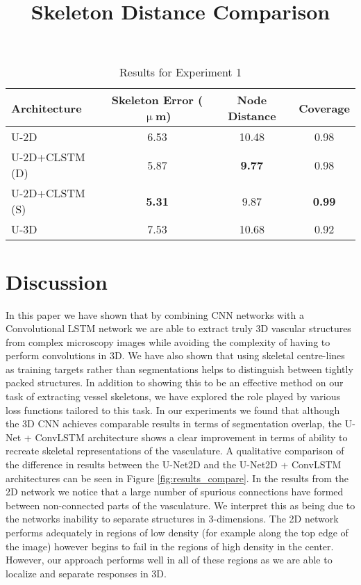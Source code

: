 \documentclass[journal,transmag]{IEEEtran}
\begin{document}
\begin{table}[h]
\title{Skeleton Distance Comparison}
\centering
\begin{tabular}{l|c|c|c}
Architecture & Skeleton Error ($\upmu$m) & Node Distance & Coverage\\
\hline
U-2D & 6.53 & 10.48 & 0.98 \\
U-2D+CLSTM (D) & 5.87 & \textbf{9.77} & 0.98 \\
U-2D+CLSTM (S) & \textbf{5.31} & 9.87 & \textbf{0.99} \\
U-3D &  7.53 & 10.68 &  0.92 \\
\end{tabular}
\caption{Results for Experiment 1}
\end{table}



\section{Discussion}

In this paper we have shown that by combining CNN networks with a Convolutional LSTM network we are able to extract truly 3D vascular structures from complex microscopy images while avoiding the complexity of having to perform convolutions in 3D. We have also shown that using skeletal centre-lines as training targets rather than segmentations helps to distinguish between tightly packed structures. In addition to showing this to be an effective method on our task of extracting vessel skeletons, we have explored the role played by various loss functions tailored to this task. In our experiments we found that although the 3D CNN achieves comparable results in terms of segmentation overlap, the U-Net + ConvLSTM architecture shows a clear improvement in terms of ability to recreate skeletal representations of the vasculature. A qualitative comparison of the difference in results between the U-Net2D and the U-Net2D + ConvLSTM architectures can be seen in Figure \ref{fig:results_compare}. In the results from the 2D network we notice that a large number of spurious connections have formed between non-connected parts of the vasculature. We interpret this as being due to the networks inability to separate structures in 3-dimensions. The 2D network performs adequately in regions of low density (for example along the top edge of the image) however begins to fail in the regions of high density in the center. However, our approach performs well in all of these regions as we are able to localize and separate responses in 3D.
\end{document}

